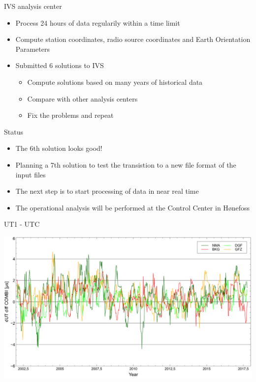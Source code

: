 \documentclass[14pt,table,t, c]{beamer}
\begin{document}
\begin{frame}{IVS analysis center}
\begin{itemize}
  \item Process 24 hours of data regularily within a time limit
  \item Compute station coordinates, radio source coordinates and Earth Orientation Parameters
  \item Submitted 6 solutions to IVS
  \begin{itemize}
   \item Compute solutions based on many years of historical data
   \item Compare with other analysis centers
   \item Fix the problems and repeat
  \end{itemize}
\end{itemize}
\end{frame}

\begin{frame}{Status}
\begin{itemize}
  \item The 6th solution looks good!
  \item Planning a 7th solution to test the transistion to a new file format of the input files
  \item The next step is to start processing of data in near real time 
  \item The operational analysis will be performed at the Control Center in Hønefoss
\end{itemize}
\end{frame}

\begin{frame}{UT1 - UTC}
\begin{centering}
    \includegraphics[width=\linewidth]{figure/iter6_dUT_nma_diff_combi}
\end{centering}
\end{frame}
\end{document}
